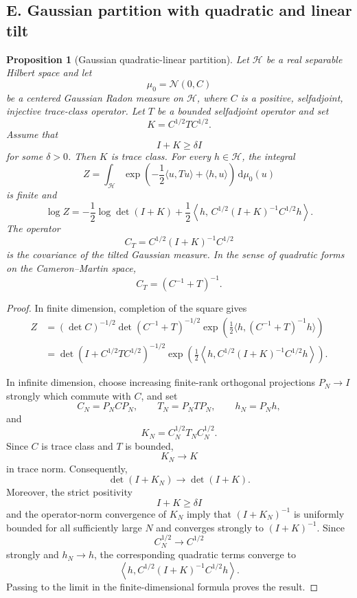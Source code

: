 \documentclass[11pt,reqno]{amsart}
\newtheorem{Proposition}[Theorem]{Proposition}
\begin{document}
\subsection*{E. Gaussian partition with quadratic and linear tilt}

\begin{Proposition}[Gaussian quadratic-linear partition]
\label{prop:gaussian-quadratic-linear}
Let $\mathcal H$ be a real separable Hilbert space and let
\[
\mu_0=\mathcal N(0,C)
\]
be a centered Gaussian Radon measure on $\mathcal H$, where $C$ is a
positive, selfadjoint, injective trace-class operator. Let $T$ be a
bounded selfadjoint operator and set
\[
K=C^{1/2}TC^{1/2}.
\]
Assume that
\[
I+K\geq\delta I
\]
for some $\delta>0$. Then $K$ is trace class. For every
$h\in\mathcal H$, the integral
\[
Z
=
\int_{\mathcal H}
\exp\left(
-\frac12\langle u,Tu\rangle+\langle h,u\rangle
\right)
\,\mathrm d\mu_0(u)
\]
is finite and
\[
\boxed{
\log Z
=
-\frac12\log\det(I+K)
+
\frac12
\left\langle
h,\,
C^{1/2}(I+K)^{-1}C^{1/2}h
\right\rangle.
}
\]
The operator
\[
C_T
=
C^{1/2}(I+K)^{-1}C^{1/2}
\]
is the covariance of the tilted Gaussian measure. In the sense of
quadratic forms on the Cameron--Martin space,
\[
C_T=(C^{-1}+T)^{-1}.
\]
\end{Proposition}

\begin{proof}
In finite dimension, completion of the square gives
\[
\begin{aligned}
Z
&=
(\det C)^{-1/2}
\det(C^{-1}+T)^{-1/2}
\exp\left(
\frac12
\langle h,(C^{-1}+T)^{-1}h\rangle
\right)
\\
&=
\det(I+C^{1/2}TC^{1/2})^{-1/2}
\exp\left(
\frac12
\left\langle
h,
C^{1/2}(I+K)^{-1}C^{1/2}h
\right\rangle
\right).
\end{aligned}
\]

In infinite dimension, choose increasing finite-rank orthogonal
projections $P_N\to I$ strongly which commute with $C$, and set
\[
C_N=P_NCP_N,
\qquad
T_N=P_NTP_N,
\qquad
h_N=P_Nh,
\]
and
\[
K_N=C_N^{1/2}T_NC_N^{1/2}.
\]
Since $C$ is trace class and $T$ is bounded,
\[
K_N\longrightarrow K
\]
in trace norm. Consequently,
\[
\det(I+K_N)\longrightarrow\det(I+K).
\]
Moreover, the strict positivity
\[
I+K\geq\delta I
\]
and the operator-norm convergence of $K_N$ imply that
$(I+K_N)^{-1}$ is uniformly bounded for all sufficiently large $N$ and
converges strongly to $(I+K)^{-1}$. Since
\[
C_N^{1/2}\longrightarrow C^{1/2}
\]
strongly and $h_N\to h$, the corresponding quadratic terms converge to
\[
\left\langle
h,
C^{1/2}(I+K)^{-1}C^{1/2}h
\right\rangle.
\]
Passing to the limit in the finite-dimensional formula proves the
result.
\end{proof}
\end{document}
